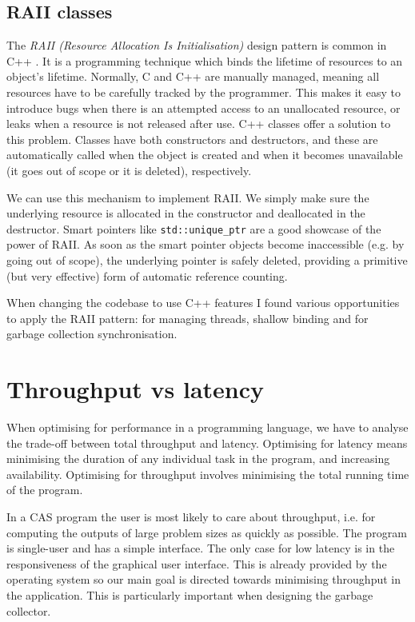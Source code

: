\subsection{RAII classes}
\label{sec:raii}
The \emph{RAII (Resource Allocation Is Initialisation)} design pattern is common in C++ \cite[Item~37]{effective-cpp}.
It is a programming technique which binds the lifetime of resources to an object's lifetime. Normally,
C and C++ are manually managed, meaning all resources have to be carefully tracked by the programmer.
This makes it easy to introduce bugs when there is an attempted access to an unallocated resource,
or leaks when a resource is not released after use. C++ classes offer a solution to this problem.
Classes have both constructors and destructors, and these are automatically called when the object
is created and when it becomes unavailable (it goes out of scope or it is deleted), respectively.

We can use this mechanism to implement RAII. We simply make sure
the underlying resource is allocated in the constructor and deallocated in the destructor.
Smart pointers like \verb|std::unique_ptr| are a good showcase of the power of RAII. As soon as the
smart pointer objects become inaccessible (e.g. by going out of scope), the underlying pointer
is safely deleted, providing a primitive (but very effective) form of automatic reference counting.

When changing the codebase to use C++ features I found various opportunities to apply the RAII pattern:
for managing threads, shallow binding and for garbage collection synchronisation.

\section{Throughput vs latency}
When optimising for performance in a programming language, we have to analyse the trade-off between
total throughput and latency. Optimising for latency means minimising the duration of any individual
task in the program, and increasing availability. Optimising for throughput involves minimising the
total running time of the program.

In a CAS program the user is most likely to care about throughput, i.e. for computing the outputs of large
problem sizes as quickly as possible. The program is single-user and has a simple interface. The only case
for low latency is in the responsiveness of the graphical user interface. This is already provided by the
operating system so our main goal is directed towards minimising throughput in the application.
This is particularly important when designing the garbage collector.


